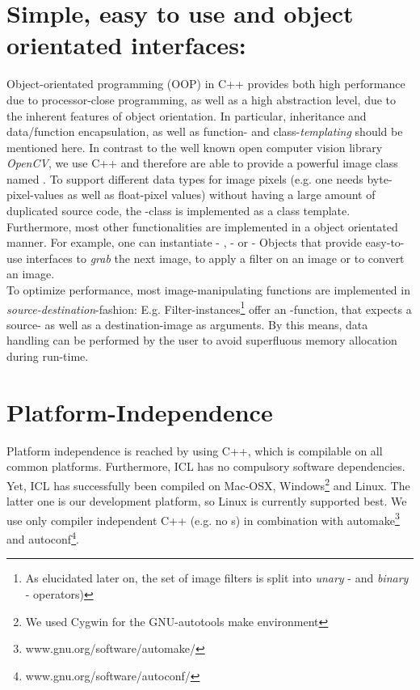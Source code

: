 \section{Simple, easy to use and object orientated interfaces:}
Object-orientated programming (OOP) in C++ provides both high performance due to processor-close programming, as well as a high abstraction level, due to the inherent features of object orientation. In particular, inheritance and data/function encapsulation, as well as function- and class-\emph{templating} should be mentioned here. In contrast to the well known open computer vision library \emph{OpenCV}, we use C++ and therefore are able to provide a powerful image class named  . To support different data types for image pixels (e.g. one needs byte-pixel-values as well as float-pixel values) without having a large amount of duplicated source code, the -class is implemented as a class template.\\
Furthermore, most other functionalities are implemented in a object orientated manner. For example, one can instantiate  - ,  - or  - Objects that provide easy-to-use interfaces to \emph{grab} the next image, to apply a filter on an image or to convert an image.\\
To optimize performance, most image-manipulating functions are implemented in \emph{source-destination}-fashion: E.g. Filter-instances\footnote{As elucidated later on, the set of image filters is split into \emph{unary} - and \emph{binary} - operators)} offer an -function, that expects a source- as well as a destination-image as arguments. By this means, data handling can be performed by the user to avoid superfluous memory allocation during run-time. 


\section{Platform-Independence}
Platform independence is reached by using C++, which is compilable on all common platforms. Furthermore, ICL has no compulsory software dependencies. Yet, ICL has successfully been compiled on Mac-OSX, Windows\footnote{We used Cygwin for the GNU-autotools make environment} and Linux. The latter one is our development platform, so Linux is currently supported best. We use only compiler independent C++ (e.g. no s) in combination with automake\footnote{www.gnu.org/software/automake/} and autoconf\footnote{www.gnu.org/software/autoconf/}.  

